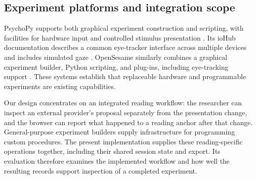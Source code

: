\subsection{Experiment platforms and integration scope}

PsychoPy supports both graphical experiment construction and scripting, with facilities for hardware input and controlled stimulus presentation \citep{peirce2019psychopy}. Its ioHub documentation describes a common eye-tracker interface across multiple devices and includes simulated gaze \citep{psychopy2026iohub}. OpenSesame similarly combines a graphical experiment builder, Python scripting, and plug-ins, including eye-tracking support \citep{mathot2012opensesame}. These systems establish that replaceable hardware and programmable experiments are existing capabilities.

Our design concentrates on an integrated reading workflow: the researcher can inspect an external provider's proposal separately from the presentation change, and the browser can report what happened to a reading anchor after that change. General-purpose experiment builders supply infrastructure for programming custom procedures. The present implementation supplies these reading-specific operations together, including their shared session state and export. Its evaluation therefore examines the implemented workflow and how well the resulting records support inspection of a completed experiment.
